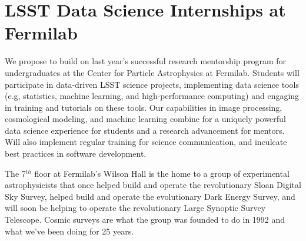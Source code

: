 
\section{LSST Data Science Internships at Fermilab}


 
We propose to build on last year's successful research mentorship program for undergraduates at the Center for Particle Astrophysics at Fermilab.
Students will participate in data-driven LSST science projects, implementing data science tools (e.g, statistics, machine learning, and high-performance computing) and engaging in training and tutorials on these tools.
Our capabilities in image processing, cosmological modeling, and machine learning combine for a uniquely powerful
data science experience for students and a research advancement for mentors.
Will also implement regular training for science communication, and inculcate best practices in software development.


The 7$^{th}$ floor at Fermilab's Wilson Hall is the home to a 
group of experimental astrophysicists that once helped build and operate
the revolutionary Sloan Digital Sky Survey, helped build and operate
the evolutionary Dark Energy Survey, and will soon be helping to operate 
the revolutionary Large Synoptic Survey Telescope. Cosmic surveys are
what the group was founded to do in 1992 and what we've been doing for 25 years.



